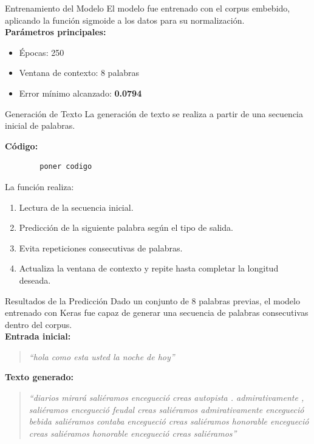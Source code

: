\documentclass{beamer}
\begin{document}
\begin{frame}{Entrenamiento del Modelo}
	\small
	El modelo fue entrenado con el corpus embebido, aplicando la función sigmoide a los datos para su normalización.\\[0.5em]
	
	\textbf{Parámetros principales:}
	\begin{itemize}
		\item Épocas: 250
		\item Ventana de contexto: 8 palabras
		\item Error mínimo alcanzado: \textbf{0.0794}
	\end{itemize}
	
	
\end{frame}

\begin{frame}[fragile]{Generación de Texto}
	\small
	La generación de texto se realiza a partir de una secuencia inicial de palabras.
	
	\vspace{0.5em}
	\textbf{Código:}
	\begin{verbatim}
		poner codigo
	\end{verbatim}
	
	\vspace{0.5em}
	La función realiza:
	\begin{enumerate}
		\item Lectura de la secuencia inicial.
		\item Predicción de la siguiente palabra según el tipo de salida.
		\item Evita repeticiones consecutivas de palabras.
		\item Actualiza la ventana de contexto y repite hasta completar la longitud deseada.
	\end{enumerate}
\end{frame}


\begin{frame}{Resultados de la Predicción}
	\small
	Dado un conjunto de 8 palabras previas, el modelo entrenado con Keras fue capaz de generar una secuencia de palabras consecutivas dentro del corpus.\\[0.5em]
	
	\textbf{Entrada inicial:}
	\begin{quote}
		\textit{``hola como esta usted la noche de hoy''}
	\end{quote}
	
	\textbf{Texto generado:}
	\begin{quote}
		\textit{``diarios mirará saliéramos encegueció creas autopista . admirativamente , saliéramos encegueció feudal creas saliéramos admirativamente encegueció bebida saliéramos contaba encegueció creas saliéramos honorable encegueció creas saliéramos honorable encegueció creas saliéramos''}
	\end{quote}
\end{frame}	

	


	
	
\end{document}
